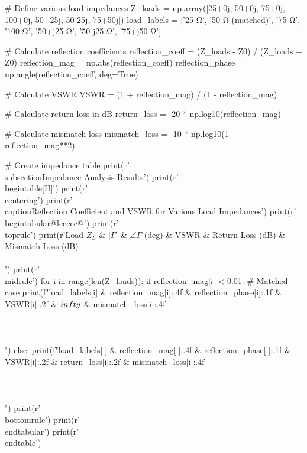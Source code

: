 \documentclass[11pt,a4paper]{article}
\begin{document}
\begin{pycode}
# Define various load impedances
Z_loads = np.array([25+0j, 50+0j, 75+0j, 100+0j, 50+25j, 50-25j, 75+50j])
load_labels = ['25 Ω', '50 Ω (matched)', '75 Ω', '100 Ω',
               '50+j25 Ω', '50-j25 Ω', '75+j50 Ω']

# Calculate reflection coefficients
reflection_coeff = (Z_loads - Z0) / (Z_loads + Z0)
reflection_mag = np.abs(reflection_coeff)
reflection_phase = np.angle(reflection_coeff, deg=True)

# Calculate VSWR
VSWR = (1 + reflection_mag) / (1 - reflection_mag)

# Calculate return loss in dB
return_loss = -20 * np.log10(reflection_mag)

# Calculate mismatch loss
mismatch_loss = -10 * np.log10(1 - reflection_mag**2)

# Create impedance table
print(r'\\subsection{Impedance Analysis Results}')
print(r'\\begin{table}[H]')
print(r'\\centering')
print(r'\\caption{Reflection Coefficient and VSWR for Various Load Impedances}')
print(r'\\begin{tabular}{@{}lccccc@{}}')
print(r'\\toprule')
print(r'Load $Z_L$ & $|\Gamma|$ & $\angle\Gamma$ (deg) & VSWR & Return Loss (dB) & Mismatch Loss (dB) \\\\')
print(r'\\midrule')
for i in range(len(Z_loads)):
    if reflection_mag[i] < 0.01:  # Matched case
        print(f"{load_labels[i]} & {reflection_mag[i]:.4f} & {reflection_phase[i]:.1f} & {VSWR[i]:.2f} & $\\infty$ & {mismatch_loss[i]:.4f} \\\\\\\\")
    else:
        print(f"{load_labels[i]} & {reflection_mag[i]:.4f} & {reflection_phase[i]:.1f} & {VSWR[i]:.2f} & {return_loss[i]:.2f} & {mismatch_loss[i]:.4f} \\\\\\\\")
print(r'\\bottomrule')
print(r'\\end{tabular}')
print(r'\\end{table}')


\end{pycode}
\end{document}
